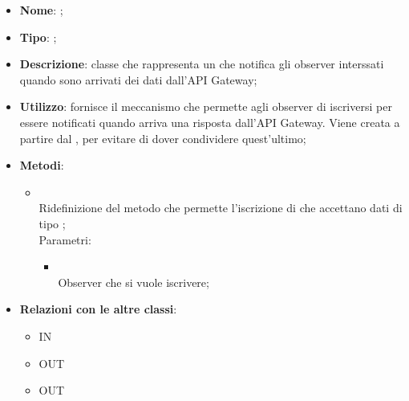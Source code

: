 \begin{itemize}
	\item \textbf{Nome}: ;
	\item \textbf{Tipo}: ;
	\item \textbf{Descrizione}: classe che rappresenta un  che notifica gli observer interssati quando sono arrivati dei dati dall'API Gateway;
	\item \textbf{Utilizzo}: fornisce il meccanismo che permette agli observer di iscriversi per essere notificati quando arriva una risposta dall'API Gateway. Viene creata a partire dal , per evitare di dover condividere quest'ultimo;
	\item \textbf{Metodi}:
	\begin{itemize}
		\item[]  \\
		Ridefinizione del metodo che permette l'iscrizione di  che accettano dati di tipo ;\\
		Parametri:
		\begin{itemize}
			\item {} \\
			Observer che si vuole iscrivere;
		\end{itemize}
	\end{itemize}
	\item \textbf{Relazioni con le altre classi}:
	\begin{itemize}
		\item IN \hyperlink{Logic_label}{}
		\item OUT \hyperlink{ApplicationManagerObserver_label}{}
		\item OUT \hyperlink{PlayerObserver_label}{}
	\end{itemize}
\end{itemize}
\FloatBarrier

